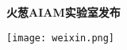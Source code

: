 \begin{adjustwidth}{0.5in}{0in}
\begin{flushright}
    \vspace*{9mm}
    
    \vspace*{-1mm}\hspace*{-1mm}\textbf{火葱AIAM实验室发布}\par

    \vspace*{0.2mm}
    \texttt{[image: weixin.png]}%
\end{flushright}
\end{adjustwidth}
